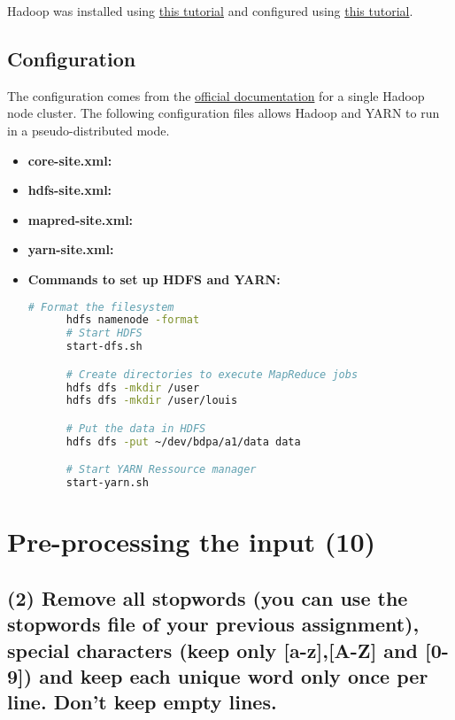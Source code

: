 \documentclass[a4paper,10pt]{article}
\begin{document}
Hadoop was installed using \href{https://www.digitalocean.com/community/tutorials/how-to-install-hadoop-in-stand-alone-mode-on-ubuntu-16-04}{this tutorial} and configured using \href{https://hadoop.apache.org/docs/stable/hadoop-project-dist/hadoop-common/SingleCluster.html}{this tutorial}.


\subsection{Configuration}
The configuration comes from the \href{https://hadoop.apache.org/docs/stable/hadoop-project-dist/hadoop-common/SingleCluster.html}{official documentation} for a single Hadoop node cluster.
The following configuration files allows Hadoop and YARN to run in a pseudo-distributed mode.
\begin{itemize}
    \item \textbf{core-site.xml:}
    
    \item \textbf{hdfs-site.xml:}
    
    \item \textbf{mapred-site.xml:}
    
    \item \textbf{yarn-site.xml:}
    
    \item \textbf{Commands to set up HDFS and YARN:}
    \begin{lstlisting}[language=bash]
      # Format the filesystem
      hdfs namenode -format
      # Start HDFS
      start-dfs.sh

      # Create directories to execute MapReduce jobs
      hdfs dfs -mkdir /user
      hdfs dfs -mkdir /user/louis

      # Put the data in HDFS
      hdfs dfs -put ~/dev/bdpa/a1/data data

      # Start YARN Ressource manager
      start-yarn.sh
    \end{lstlisting}
\end{itemize}

\section{Pre-processing the input (10)}
\subsection{(2) Remove all stopwords (you can use the stopwords file of your previous
assignment), special characters (keep only [a-z],[A-Z] and [0-9]) and keep each unique
word only once per line. Don’t keep empty lines.}
\end{document}
